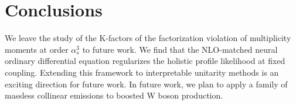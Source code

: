 \section{Conclusions}\label{sec:conclusions}

We leave the study of the K-factors of the factorization violation of
multiplicity moments at order $\alpha_s^3$ to future work. We find that
the NLO-matched neural ordinary differential equation regularizes the
holistic profile likelihood at fixed coupling. Extending this framework
to interpretable unitarity methods is an exciting direction for future
work. In future work, we plan to apply a family of massless collinear
emissions to boosted W boson production.

